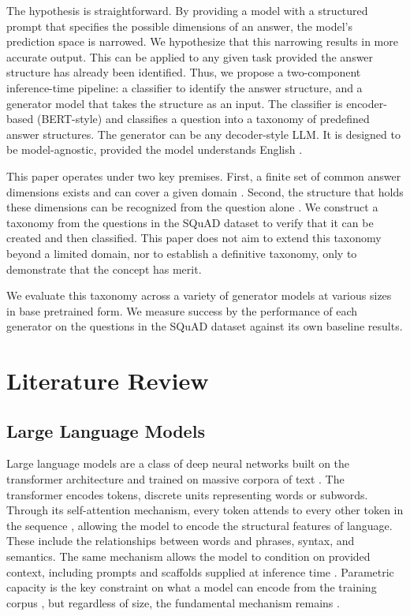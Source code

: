 \documentclass{article}
\begin{document}
The hypothesis is straightforward. By providing a model with a structured prompt that specifies the possible dimensions of an answer, the model's prediction space is narrowed. We hypothesize that this narrowing results in more accurate output. This can be applied to any given task provided the answer structure has already been identified. Thus, we propose a two-component inference-time pipeline: a classifier to identify the answer structure, and a generator model that takes the structure as an input. The classifier is encoder-based (BERT-style) \cite{devlin2019bert} and classifies a question into a taxonomy of predefined answer structures. The generator can be any decoder-style LLM. It is designed to be model-agnostic, provided the model understands English \cite{smalllmsready2024}.

This paper operates under two key premises. First, a finite set of common answer dimensions exists and can cover a given domain \cite{nonfactoid_taxonomy2022}. Second, the structure that holds these dimensions can be recognized from the question alone \cite{liroth2002questions}. We construct a taxonomy from the questions in the SQuAD dataset to verify that it can be created and then classified. This paper does not aim to extend this taxonomy beyond a limited domain, nor to establish a definitive taxonomy, only to demonstrate that the concept has merit.

We evaluate this taxonomy across a variety of generator models at various sizes in base pretrained form. We measure success by the performance of each generator on the questions in the SQuAD dataset against its own baseline results.

\section{Literature Review}

\subsection{Large Language Models}

Large language models are a class of deep neural networks built on the transformer architecture and trained on massive corpora of text \cite{vaswani2017attention, llmoverview2023}. The transformer encodes tokens, discrete units representing words or subwords. Through its self-attention mechanism, every token attends to every other token in the sequence \cite{vaswani2017attention}, allowing the model to encode the structural features of language. These include the relationships between words and phrases, syntax, and semantics. The same mechanism allows the model to condition on provided context, including prompts and scaffolds supplied at inference time \cite{brown2020gpt3}. Parametric capacity is the key constraint on what a model can encode from the training corpus \cite{kaplan2020scaling}, but regardless of size, the fundamental mechanism remains \cite{costofdownscaling2023}.
\end{document}
